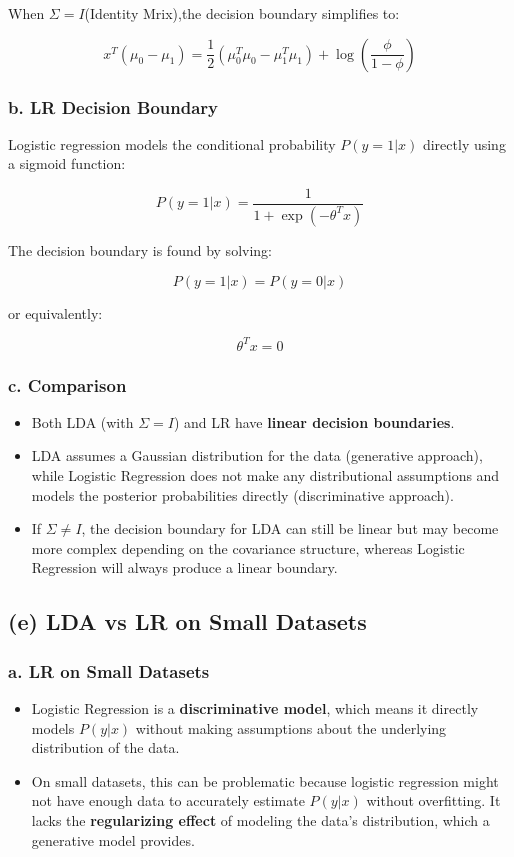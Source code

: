 \documentclass[12pt]{article}
\begin{document}
When \(\Sigma=I\)(Identity Mrix),the decision boundary simplifies to:

\[
    x^T (\mu_0 - \mu_1) = \frac{1}{2} (\mu_0^T \mu_0 - \mu_1^T \mu_1) + \log \left( \frac{\phi}{1 - \phi} \right)
\]

\subsubsection*{b. LR Decision Boundary}

Logistic regression models the conditional probability \(P(y = 1 | x)\) directly using a sigmoid function:

\[
    P(y = 1 | x) = \frac{1}{1 + \exp\left(- \theta^T x \right)}
\]

The decision boundary is found by solving:

\[
    P(y = 1 | x) = P(y = 0 | x)
\]

or equivalently:

\[
    \theta^T x = 0
\]

\subsubsection*{c. Comparison}

\begin{itemize}
    \item Both LDA (with \(\Sigma = I\)) and LR have \textbf{linear decision boundaries}.
    \item LDA assumes a Gaussian distribution for the data (generative approach), while Logistic Regression does not make any distributional assumptions and models the posterior probabilities directly (discriminative approach).
    \item If \(\Sigma \neq I\), the decision boundary for LDA can still be linear but may become more complex depending on the covariance structure, whereas Logistic Regression will always produce a linear boundary.
\end{itemize}

\subsection*{(e) LDA vs LR on Small Datasets}

\subsubsection*{a. LR on Small Datasets}

\begin{itemize}
    \item Logistic Regression is a \textbf{discriminative model}, which means it directly models \(P(y | x)\) without making assumptions about the underlying distribution of the data.
    \item On small datasets, this can be problematic because logistic regression might not have enough data to accurately estimate \(P(y | x)\) without overfitting. It lacks the \textbf{regularizing effect} of modeling the data's distribution, which a generative model provides.
\end{itemize}
\end{document}
